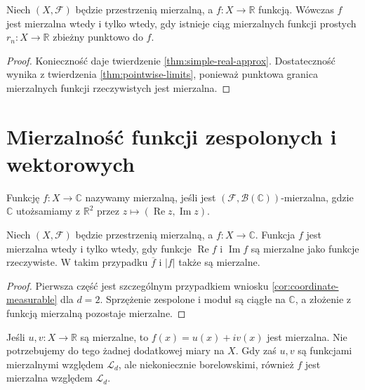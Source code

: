 \begin{wniosek}
\label{cor:meas-simple-characterization}
Niech $(X,\mathcal F)$ będzie przestrzenią mierzalną,
a $f:X\to\mathbb R$ funkcją. Wówczas $f$ jest
mierzalna wtedy i tylko wtedy, gdy istnieje
ciąg mierzalnych funkcji prostych $r_n:X\to\mathbb R$
zbieżny punktowo do $f$.
\end{wniosek}
\begin{proof}
Konieczność daje twierdzenie \ref{thm:simple-real-approx}.
Dostateczność wynika z twierdzenia
\ref{thm:pointwise-limits}, ponieważ punktowa granica
mierzalnych funkcji rzeczywistych jest mierzalna.
\end{proof}

\section{Mierzalność funkcji zespolonych i wektorowych}

\begin{definicja}\label{idx:06:definicja:11}

Funkcję $f:X\to\mathbb C$ nazywamy mierzalną,
jeśli jest $(\mathcal F,\mathcal B(\mathbb C))$-mierzalna,
gdzie $\mathbb C$ utożsamiamy z $\mathbb R^2$
przez $z\mapsto(\operatorname{Re}z,\operatorname{Im}z)$.
\end{definicja}

\begin{twierdzenie}
\label{thm:complex-test}
Niech $(X,\mathcal F)$ będzie przestrzenią mierzalną,
a $f:X\to\mathbb C$. Funkcja $f$ jest mierzalna
wtedy i tylko wtedy, gdy funkcje
$\operatorname{Re}f$ i $\operatorname{Im}f$ są
mierzalne jako funkcje rzeczywiste. W takim przypadku
$\overline f$ i $|f|$ także są mierzalne.
\end{twierdzenie}
\begin{proof}
Pierwsza część jest szczególnym przypadkiem
wniosku \ref{cor:coordinate-measurable} dla $d=2$.
Sprzężenie zespolone i moduł są ciągłe na $\mathbb C$,
a złożenie z funkcją mierzalną pozostaje mierzalne.
\end{proof}

\begin{przyklad}
Jeśli $u,v:X\to\mathbb R$ są mierzalne, to
$f(x)=u(x)+iv(x)$ jest mierzalna.
Nie potrzebujemy do tego żadnej dodatkowej miary
na $X$. Gdy zaś $u,v$ są funkcjami mierzalnymi
względem $\mathcal L_d$, ale niekoniecznie
borelowskimi, również $f$ jest mierzalna względem
$\mathcal L_d$.
\end{przyklad}

